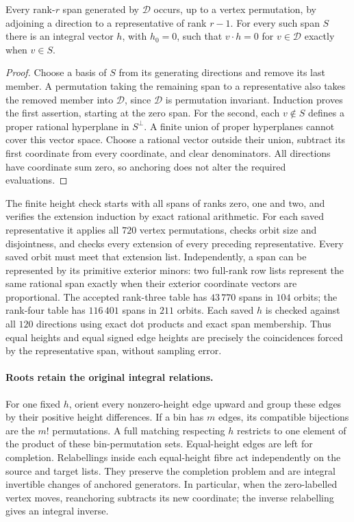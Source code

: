 \begin{lemma}
Every rank-$r$ span generated by $\mathcal D$ occurs, up to a vertex
permutation, by adjoining a direction to a representative of rank $r-1$.
For every such span $S$ there is an integral vector $h$, with $h_0=0$,
such that $v\cdot h=0$ for $v\in\mathcal D$ exactly when $v\in S$.
\end{lemma}
\begin{proof}
Choose a basis of $S$ from its generating directions and remove its last
member. A permutation taking the remaining span to a representative
also takes the removed member into $\mathcal D$, since $\mathcal D$ is
permutation invariant. Induction proves the first assertion, starting
at the zero span. For the second, each $v\notin S$ defines a proper
rational hyperplane in $S^\perp$. A finite union of proper hyperplanes
cannot cover this vector space. Choose a rational vector outside their
union, subtract its first coordinate from every coordinate, and clear
denominators. All directions have coordinate sum zero, so anchoring
does not alter the required evaluations.
\end{proof}

The finite height check starts with all spans of ranks zero, one and
two, and verifies the extension induction by exact rational arithmetic.
For each saved representative it applies all $720$ vertex permutations,
checks orbit size and disjointness, and checks every extension of every
preceding representative. Every saved orbit must meet that extension
list. Independently, a span can be represented by its primitive exterior
minors: two full-rank row lists represent the same rational span exactly
when their exterior coordinate vectors are proportional. The accepted
rank-three table has $43\,770$ spans in $104$ orbits; the rank-four table
has $116\,401$ spans in $211$ orbits. Each saved $h$ is checked against
all $120$ directions using exact dot products and exact span membership.
Thus equal heights and equal signed edge heights are precisely the
coincidences forced by the representative span, without sampling error.

\paragraph{Roots retain the original integral relations.}
For one fixed $h$, orient every nonzero-height edge upward and group
these edges by their positive height differences. If a bin has $m$
edges, its compatible bijections are the $m!$ permutations. A full
matching respecting $h$ restricts to one element of the product of
these bin-permutation sets. Equal-height edges are left for completion.
Relabellings inside each equal-height fibre act independently on the
source and target lists. They preserve the completion problem and
are integral invertible changes of anchored generators. In particular,
when the zero-labelled vertex moves, reanchoring subtracts its new
coordinate; the inverse relabelling gives an integral inverse.

